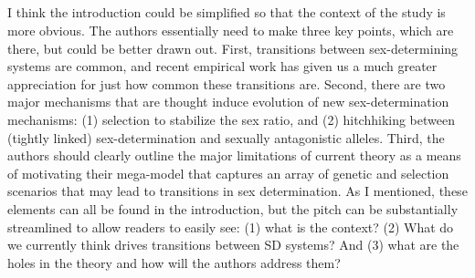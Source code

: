 \documentclass[10pt,letterpaper]{article}
\begin{document}
\noindent\subsection{}
I think the introduction could be simplified so that the context of the study is more obvious. The authors essentially need to make three key points, which are there, but could be better drawn out. First, transitions between sex-determining systems are common, and recent empirical work has given us a much greater appreciation for just how common these transitions are. Second, there are two major mechanisms that are thought induce evolution of new sex-determination mechanisms: (1) selection to stabilize the sex ratio, and (2) hitchhiking between (tightly linked) sex-determination and sexually antagonistic alleles. Third, the authors should clearly outline the major limitations of current theory as a means of motivating their mega-model that captures an array of genetic and selection scenarios that may lead to transitions in sex determination. As I mentioned, these elements can all be found in the introduction, but the pitch can be substantially streamlined to allow readers to easily see: (1) what is the context? (2) What do we currently think drives transitions between SD systems? And (3) what are the holes in the theory and how will the authors address them?
\end{document}
